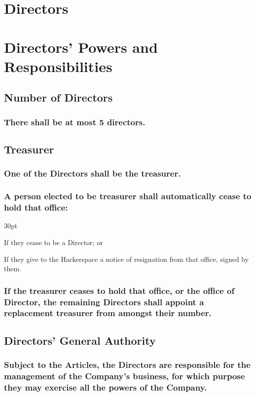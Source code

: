 \documentclass[12pt]{article}
\def\clauseindent{30pt}
\newenvironment{subindent}{\begin{adjustwidth}{\clauseindent}{}\begin{hanginglist}}{\end{hanginglist}\end{adjustwidth}}
\begin{document}
\section*{Directors}
\section*{Directors' Powers and Responsibilities}

\subsection{Number of Directors}
\subsubsection{There shall be at most 5 directors.}

\subsection{Treasurer}
\subsubsection{One of the Directors shall be the treasurer.}
\subsubsection{A person elected to be treasurer shall automatically cease to hold that office:}
\begin{subindent}
  \item If they cease to be a Director; or
  \item If they give to the Hackerspace a notice of resignation from that office, signed by them.
\end{subindent}
\subsubsection{If the treasurer ceases to hold that office, or the office of Director, the remaining Directors shall appoint a replacement treasurer from amongst their number.}

\subsection{Directors' General Authority}
\subsubsection{Subject to the Articles, the Directors are responsible for the management of the Company’s business, for which purpose they may exercise all the powers of the Company.}
\end{document}
